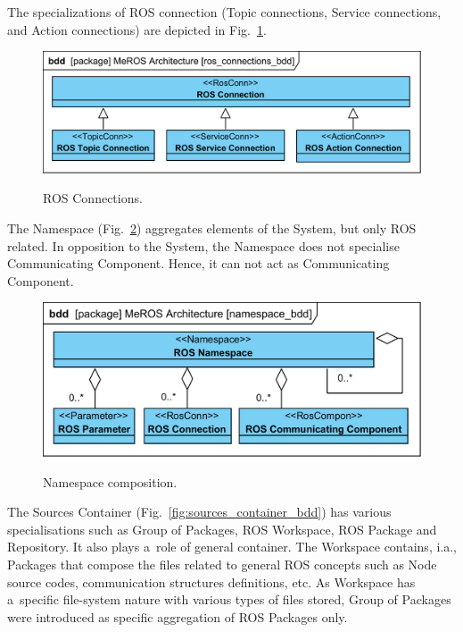 \documentclass[11pt,oneside,a4paper]{report}
\begin{document}
		 The specializations of ROS connection (Topic connections, Service connections, and Action connections) are depicted in Fig.~\ref{fig:ros_connections_bdd}. 
	
	
	\begin{figure}[H]
		\centering
		\begin{center}
			{\includegraphics[scale=1.0]{diagrams/ros_connections_bdd.png}}
		\end{center}
		\caption{ROS Connections.} 
		\label{fig:ros_connections_bdd}
	\end{figure}

	
	The Namespace (Fig.~\ref{fig:namespace_bdd}) aggregates elements of the System, but only ROS related. In opposition to the System, the Namespace does not specialise Communicating Component. Hence, it can not act as Communicating Component.
	
	
	\begin{figure}[H]
		\centering
		\begin{center}
			{\includegraphics[scale=1.0]{diagrams/namespace_bdd.png}}
		\end{center}
		\caption{Namespace composition.}
		\label{fig:namespace_bdd}
	\end{figure}
	
	The Sources Container (Fig.~\ref{fig:sources_container_bdd}) has various specialisations such as Group of Packages, ROS Workspace, ROS Package and Repository. It also plays a~role of general container.  
	The Workspace contains, i.a., Packages that compose the files related to general ROS concepts such as Node source codes, communication structures definitions, etc. As Workspace has a~specific file-system nature with various types of files stored, Group of Packages were introduced as specific aggregation of ROS Packages only.
	
\end{document}
